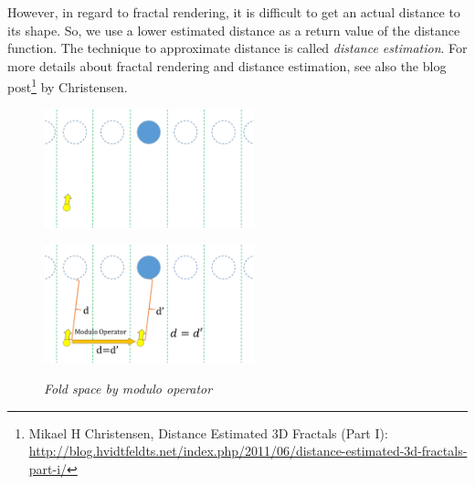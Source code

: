 However, in regard to fractal rendering, it is difficult to
get an actual distance to its shape. So, we use a lower estimated distance
as a return value of the distance function. The technique to approximate
distance is called \textit{distance estimation}.
For more details about fractal rendering and distance estimation, see also the blog
post\footnote{Mikael H Christensen, Distance Estimated 3D Fractals (Part I):\\ \quad\quad
\url{http://blog.hvidtfeldts.net/index.php/2011/06/distance-estimated-3d-fractals-part-i/}}
by Christensen. 

\begin{figure}[htbp]
 \begin{minipage}[t]{0.5\hsize}
  \center
  \includegraphics[height=1.35in, keepaspectratio]{img/visualization/translate1.png}
  \subcaption{\textit{}}
  \label{fig:modulo1}
  \hspace*{\fill}
 \end{minipage}
 \begin{minipage}[t]{0.5\hsize}
  \center
  \includegraphics[height=1.35in, keepaspectratio]{img/visualization/translate2.png}
  \subcaption{\textit{}}
  \label{fig:modulo2}
  \hspace*{\fill}
 \end{minipage}
 \caption{\textit{Fold space by modulo operator}}
 \label{fig:moduloAll}
\end{figure}

